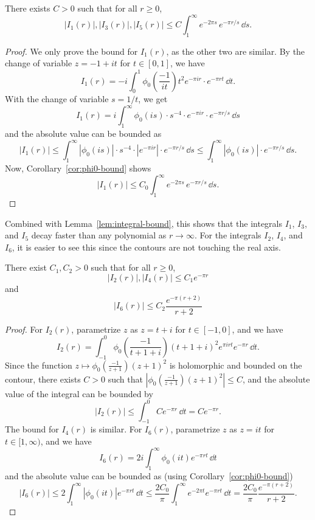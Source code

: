 \begin{lemma}\label{lem:bound-I1-I3-I5}\leanok
    There exists $C > 0$ such that for all $r \geq 0$,
    \begin{equation}
        |I_1(r)|, |I_3(r)|, |I_5(r)| \leq C \int_1^{\infty} e^{-2\pi s} \, e^{-\pi r / s} \, \dd s.
    \end{equation}
\end{lemma}
\begin{proof}\leanok
    We only prove the bound for $I_1(r)$, as the other two are similar.
    By the change of variable $z = -1 + i t$ for $t \in [0,1]$, we have
    $$
    I_1(r) = -i \int_0^1 \phi_0\left(\frac{-1}{i t}\right) t^2 e^{-\pi i r} \cdot e^{-\pi r t} \, \dd t.
    $$
    With the change of variable $s = 1 / t$, we get
    $$
    I_1(r) = i \int_1^{\infty} \phi_0(i s) \cdot s^{-4} \cdot e^{-\pi i r} \cdot e^{-\pi r / s} \, \dd s
    $$
    and the absolute value can be bounded as
    $$
    |I_1(r)| \leq \int_1^{\infty} |\phi_0(i s)| \cdot s^{-4} \cdot |e^{-\pi i r}| \cdot e^{-\pi r / s} \, \dd s \le \int_1^{\infty} |\phi_0(is)| \cdot e^{-\pi r / s} \, \dd s.
    $$
    Now, Corollary~\ref{cor:phi0-bound} shows
    $$
    |I_1(r)| \leq C_0 \int_1^{\infty} e^{-2\pi s} \, e^{-\pi r / s} \, \dd s.
    $$
\end{proof}
Combined with Lemma~\ref{lem:integral-bound}, this shows that the integrals $I_1$, $I_3$, and $I_5$ decay faster than any polynomial as $r \to \infty$.
For the integrals $I_2$, $I_4$, and $I_6$, it is easier to see this since the contours are not touching the real axis.
\begin{lemma}\label{lem:bound-I2-I4-I6}\leanok
    There exist $C_1, C_2 > 0$ such that for all $r \geq 0$,
    \begin{equation}
        |I_2(r)|, |I_4(r)| \leq C_1 e^{-\pi r}
    \end{equation}
    and
    \begin{equation}
        |I_6(r)| \leq C_2 \frac{e^{-\pi(r + 2)}}{r + 2}
    \end{equation}
\end{lemma}
\begin{proof}\leanok
    For $I_2(r)$, parametrize $z$ as $z = t + i$ for $t \in [-1,0]$, and we have
    $$
        I_2(r) = \int_{-1}^0 \phi_0\left(\frac{-1}{t + 1 + i}\right) (t + 1 + i)^2 e^{\pi i r t} e^{-\pi r} \, \dd t.
    $$
    Since the function $z \mapsto \phi_0\left(\frac{-1}{z+1}\right) (z+1)^2$ is holomorphic and bounded on the contour,
    there exists $C > 0$ such that $|\phi_0\left(\frac{-1}{z+1}\right) (z + 1)^2| \leq C$, and the absolute value of the integral can be bounded by
    $$
        |I_2(r)| \le \int_{-1}^{0} C e^{-\pi r} \, \dd t = C e^{-\pi r}.
    $$
    The bound for $I_4(r)$ is similar.
    For $I_6(r)$, parametrize $z$ as $z = i t$ for $t \in [1, \infty)$, and we have
    $$
        I_6(r) = 2 i \int_1^{\infty} \phi_0(i t) e^{-\pi r t} \, \dd t
    $$
    and the absolute value can be bounded as (using Corollary~\ref{cor:phi0-bound})
    $$
        |I_6(r)| \leq 2 \int_1^{\infty} |\phi_0(i t)| e^{-\pi r t} \, \dd t \leq \frac{2C_0}{\pi} \int_1^{\infty} e^{-2\pi t} e^{-\pi r t} \, \dd t = \frac{2C_0}{\pi} \frac{e^{-\pi (r + 2)}}{r + 2}.
    $$
\end{proof}

